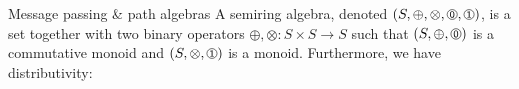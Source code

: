 \documentclass{beamer}
\begin{document}
\begin{frame}[fragile]{Message passing \& path algebras}
  A semiring algebra, denoted $(S, \oplus, \otimes, \circled{0}, \circled{1})$, is a set together with two binary operators $\oplus, \otimes: S \times S \rightarrow S$ such that $(S, \oplus, \circled{0})$ is a commutative monoid and $(S, \otimes, \circled{1})$ is a monoid. Furthermore, we have distributivity:



\end{frame}
\end{document}

